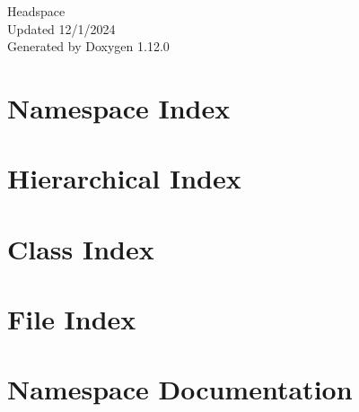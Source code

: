 \documentclass[twoside]{book}
\newcommand{\+}{\discretionary{\mbox{\scriptsize$\hookleftarrow$}}{}{}}
\newcommand{\clearemptydoublepage}{%
    \newpage{\pagestyle{empty}\cleardoublepage}%
  }
\begin{document}
  \raggedbottom
    \hypersetup{pageanchor=false,
                bookmarksnumbered=true,
                pdfencoding=unicode
               }
  \begin{titlepage}
  \vspace*{7cm}
  \begin{center}%
  {\Large Headspace}\\
  [1ex]\large Updated 12/1/2024 \\
  \vspace*{1cm}
  {\large Generated by Doxygen 1.12.0}\\
  \end{center}
  \end{titlepage}
  \clearemptydoublepage
  \tableofcontents
  \clearemptydoublepage
  \hypersetup{pageanchor=true}
\chapter{Namespace Index}

\chapter{Hierarchical Index}

\chapter{Class Index}

\chapter{File Index}

\chapter{Namespace Documentation}













\end{document}
